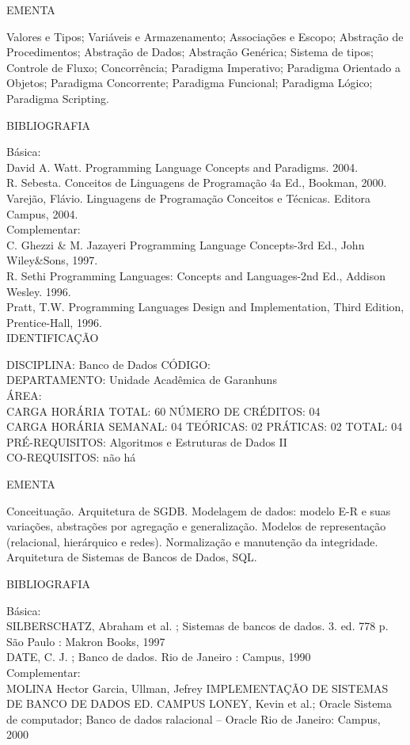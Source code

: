 \documentclass[
	12pt,				%
	openright,			%
  oneside,     %
	a4paper,			%
	english,			%
	french,				%
	spanish,			%
	brazil				%
	]{abntex2}
\begin{document}
\begin{apendicesenv}
EMENTA 

Valores e Tipos; Variáveis e Armazenamento; Associações e Escopo;
Abstração de Procedimentos; Abstração de Dados; Abstração Genérica;
Sistema de tipos; Controle de Fluxo; Concorrência; Paradigma
Imperativo; Paradigma Orientado a Objetos; Paradigma Concorrente;
Paradigma Funcional; Paradigma Lógico; Paradigma Scripting.

BIBLIOGRAFIA 

Básica:\\
David A. Watt. Programming Language Concepts and Paradigms. 2004.\\
R. Sebesta. Conceitos de Linguagens de Programação  4a Ed., Bookman,
2000.\\
Varejão, Flávio. Linguagens de Programação  Conceitos e Técnicas.
Editora Campus, 2004.\\
Complementar:\\
C. Ghezzi \& M. Jazayeri Programming Language Concepts-3rd Ed., John
Wiley\&Sons, 1997.\\
R. Sethi Programming Languages: Concepts and Languages-2nd Ed., Addison
Wesley. 1996.\\
Pratt, T.W. Programming Languages  Design and Implementation, Third
Edition, Prentice-Hall, 1996.\\


\newpage IDENTIFICAÇÃO

DISCIPLINA: Banco de Dados CÓDIGO:\\ 
DEPARTAMENTO: Unidade Acadêmica de Garanhuns\\
ÁREA: \\
CARGA HORÁRIA TOTAL: 60 NÚMERO DE CRÉDITOS: 04\\
CARGA HORÁRIA SEMANAL: 04 TEÓRICAS: 02 PRÁTICAS: 02 TOTAL: 04\\
PRÉ-REQUISITOS: Algoritmos e Estruturas de Dados II\\
CO-REQUISITOS: não há

EMENTA 

Conceituação. Arquitetura de SGDB. Modelagem de dados: modelo E-R e suas
variações, abstrações por agregação e generalização. Modelos de
representação (relacional, hierárquico e redes). Normalização e
manutenção da integridade. Arquitetura de Sistemas de Bancos de Dados,
SQL.

BIBLIOGRAFIA 

Básica: \\
SILBERSCHATZ, Abraham et al. ; Sistemas de bancos de dados. 3. ed. 778
p. São Paulo : Makron Books, 1997\\
DATE, C. J. ; Banco de dados. Rio de Janeiro : Campus, 1990\\
Complementar:\\
MOLINA Hector Garcia, Ullman, Jefrey  IMPLEMENTAÇÃO DE SISTEMAS DE
BANCO DE DADOS  ED. CAMPUS LONEY, Kevin et al.; Oracle  Sistema
de computador; Banco de dados ralacional -- Oracle Rio de Janeiro:
Campus, 2000\\



\end{apendicesenv}
\end{document}
